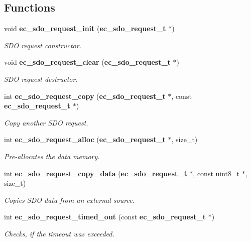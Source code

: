 \subsection*{Functions}
\begin{DoxyCompactItemize}
\item 
void {\bf ec\-\_\-sdo\-\_\-request\-\_\-init} ({\bf ec\-\_\-sdo\-\_\-request\-\_\-t} $\ast$)\label{sdo__request_8h_ad8aff35de00f93957ff85baafa8fd4e7}

\begin{DoxyCompactList}\small\item\em S\-D\-O request constructor. \end{DoxyCompactList}\item 
void {\bf ec\-\_\-sdo\-\_\-request\-\_\-clear} ({\bf ec\-\_\-sdo\-\_\-request\-\_\-t} $\ast$)\label{sdo__request_8h_a74443922a8e3286319551f013ca4a497}

\begin{DoxyCompactList}\small\item\em S\-D\-O request destructor. \end{DoxyCompactList}\item 
int {\bf ec\-\_\-sdo\-\_\-request\-\_\-copy} ({\bf ec\-\_\-sdo\-\_\-request\-\_\-t} $\ast$, const {\bf ec\-\_\-sdo\-\_\-request\-\_\-t} $\ast$)
\begin{DoxyCompactList}\small\item\em Copy another S\-D\-O request. \end{DoxyCompactList}\item 
int {\bf ec\-\_\-sdo\-\_\-request\-\_\-alloc} ({\bf ec\-\_\-sdo\-\_\-request\-\_\-t} $\ast$, size\-\_\-t)
\begin{DoxyCompactList}\small\item\em Pre-\/allocates the data memory. \end{DoxyCompactList}\item 
int {\bf ec\-\_\-sdo\-\_\-request\-\_\-copy\-\_\-data} ({\bf ec\-\_\-sdo\-\_\-request\-\_\-t} $\ast$, const uint8\-\_\-t $\ast$, size\-\_\-t)
\begin{DoxyCompactList}\small\item\em Copies S\-D\-O data from an external source. \end{DoxyCompactList}\item 
int {\bf ec\-\_\-sdo\-\_\-request\-\_\-timed\-\_\-out} (const {\bf ec\-\_\-sdo\-\_\-request\-\_\-t} $\ast$)
\begin{DoxyCompactList}\small\item\em Checks, if the timeout was exceeded. \end{DoxyCompactList}\end{DoxyCompactItemize}


